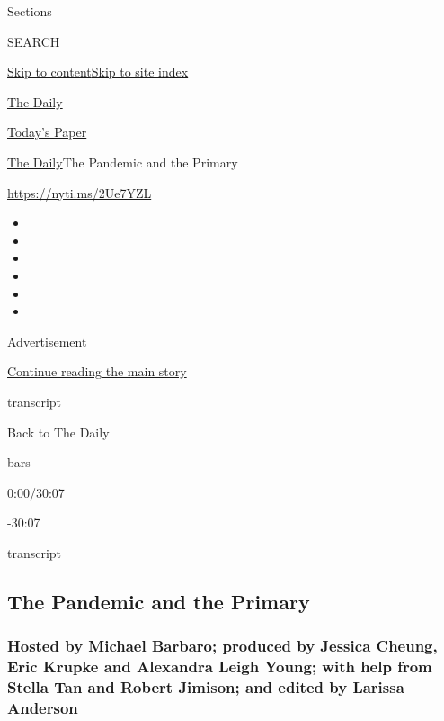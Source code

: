Sections

SEARCH

\protect\hyperlink{site-content}{Skip to
content}\protect\hyperlink{site-index}{Skip to site index}

\href{https://www.nytimes.com/podcasts/the-daily}{The Daily}

\href{https://myaccount.nytimes.com/auth/login?response_type=cookie\&client_id=vi}{}

\href{https://www.nytimes.com/section/todayspaper}{Today's Paper}

\href{/podcasts/the-daily}{The Daily}\textbar{}The Pandemic and the
Primary

\url{https://nyti.ms/2Ue7YZL}

\begin{itemize}
\item
\item
\item
\item
\item
\item
\end{itemize}

Advertisement

\protect\hyperlink{after-top}{Continue reading the main story}

transcript

Back to The Daily

bars

0:00/30:07

-30:07

transcript

\hypertarget{the-pandemic-and-the-primary}{%
\subsection{The Pandemic and the
Primary}\label{the-pandemic-and-the-primary}}

\hypertarget{hosted-by-michael-barbaro-produced-by-jessica-cheung-eric-krupke-and-alexandra-leigh-young-with-help-from-stella-tan-and-robert-jimison-and-edited-by-larissa-anderson}{%
\subsubsection{Hosted by Michael Barbaro; produced by Jessica Cheung,
Eric Krupke and Alexandra Leigh Young; with help from Stella Tan and
Robert Jimison; and edited by Larissa
Anderson}\label{hosted-by-michael-barbaro-produced-by-jessica-cheung-eric-krupke-and-alexandra-leigh-young-with-help-from-stella-tan-and-robert-jimison-and-edited-by-larissa-anderson}}

